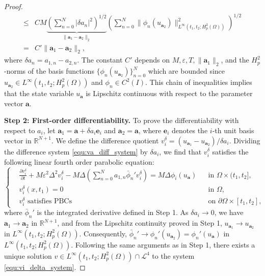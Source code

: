 \documentclass[11pt,reqno]{amsart}
\begin{document}
\begin{proof}
\begin{align*}
			\leq & C M \underbrace{\left( \sum_{n=0}^{N} |\delta a_n|^2 \right)^{1/2}}_{\|\mathbf{a}_1 - \mathbf{a}_2\|_2} \left( \sum_{n=0}^{N} \|\phi_n(u_{\mathbf{a}_2})\|_{L^{\infty}(t_1, t_2; H_p^2(\Omega))}^2 \right)^{1/2} \\
			= & C' \|\mathbf{a}_1 - \mathbf{a}_2\|_2,
	\end{align*}
	where $\delta a_n = a_{1,n} - a_{2,n}$. The constant $C'$ depends on $M, \varepsilon, T, \|\mathbf{a}_1\|_2$, and the $H_p^2$-norms of the basis functions $\{\phi_n(u_{\mathbf{a}_2})\}_{n=0}^N$ which are bounded since $u_{\mathbf{a}_2} \in L^{\infty}(t_1, t_2; H_p^2(\Omega))$ and $\phi_n \in C^2(I)$. This chain of inequalities implies that the state variable $u_{\mathbf{a}}$ is Lipschitz continuous with respect to the parameter vector $\mathbf{a}$.
	
	\textbf{Step 2: First-order differentiability.} To prove the differentiability with respect to $a_i$, let $\mathbf{a}_1 = \mathbf{a} + \delta a_i \mathbf{e}_i$ and $\mathbf{a}_2 = \mathbf{a}$, where $\mathbf{e}_i$ denotes the $i$-th unit basis vector in $\mathbb{R}^{N+1}$. We define the difference quotient $v_i^{\delta} = (u_{\mathbf{a}_1} - u_{\mathbf{a}_2})/\delta a_i$. Dividing the difference system \eqref{equ:va_diff_system} by $\delta a_i$, we find that $v_i^{\delta}$ satisfies the following linear fourth order parabolic equation:
	\begin{equation}
		\label{equ:vi_delta_system}
		\left\{
		\begin{aligned}
			&\frac{\partial v_i^{\delta}}{\partial t} + M\varepsilon^2\Delta^2 v_i^{\delta} - M \Delta \left( \sum_{n=0}^{N} a_{1,n} \bar{\phi}_n' v_i^{\delta} \right) = M \Delta \phi_i(u_{\mathbf{a}}) && \text{in } \Omega \times (t_1, t_2], \\
			&v_i^{\delta}(x, t_1) = 0 && \text{in } \Omega, \\
			&v_i^{\delta} \text{ satisfies PBCs} && \text{on } \partial\Omega \times [t_1, t_2],
		\end{aligned}
		\right.
	\end{equation}
	where $\bar{\phi}_n'$ is the integrated derivative defined in Step 1. As $\delta a_i \to 0$, we have $\mathbf{a}_1 \to \mathbf{a}_2$ in $\mathbb{R}^{N+1}$, and from the Lipschitz continuity proved in Step 1, $u_{\mathbf{a}_1} \to u_{\mathbf{a}_2}$ in $L^{\infty}(t_1, t_2; H_p^2(\Omega))$. Consequently, $\bar{\phi}_n' \to \phi_n'(u_{\mathbf{a}_2})=\phi_n'(u_{\mathbf{a}})$ in $L^{\infty}(t_1, t_2; H_p^2(\Omega))$. Following the same arguments as in Step 1, there exists a unique solution $v \in L^{\infty}(t_1,t_2; H_p^2(\Omega)) \cap \mathcal{L}^4$ to the system \eqref{equ:vi_delta_system}.

\end{proof}
\end{document}
